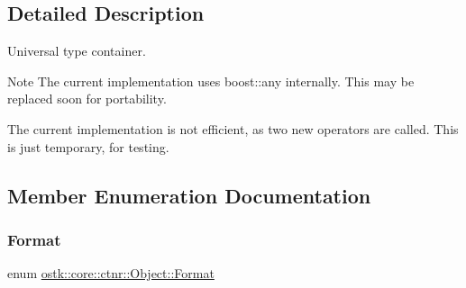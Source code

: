 \subsection{Detailed Description}
Universal type container. 

\begin{DoxyNote}{Note}
The current implementation uses boost\+::any internally. This may be replaced soon for portability. 

The current implementation is not efficient, as two new operators are called. This is just temporary, for testing. 
\end{DoxyNote}


\subsection{Member Enumeration Documentation}
\mbox{\label{classostk_1_1core_1_1ctnr_1_1_object_a3266b14cf7e3df39858f6572120e3b24}} 
\subsubsection{\texorpdfstring{Format}{Format}}
{\footnotesize\ttfamily enum \hyperlink{classostk_1_1core_1_1ctnr_1_1_object_a3266b14cf7e3df39858f6572120e3b24}{ostk\+::core\+::ctnr\+::\+Object\+::\+Format}\hspace{0.3cm}{\ttfamily [strong]}}

